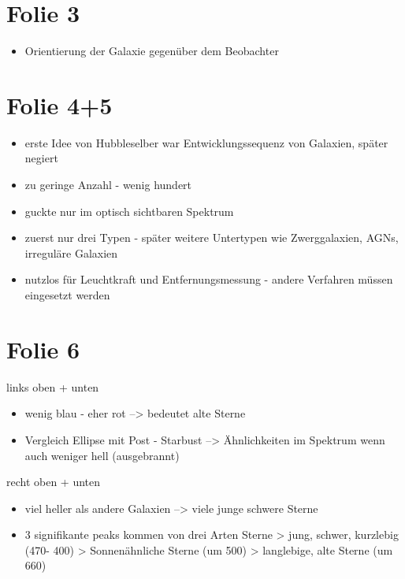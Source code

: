 





\section{Folie 3}


\begin{itemize}
\item Orientierung der Galaxie gegenüber dem Beobachter
\end{itemize}


\section{Folie 4+5}

\begin{itemize}
\item erste Idee von Hubbleselber war Entwicklungssequenz von Galaxien, später negiert
\item zu geringe Anzahl - wenig hundert
\item guckte nur im optisch sichtbaren Spektrum
\item zuerst nur drei Typen - später weitere Untertypen wie Zwerggalaxien, AGNs, irreguläre Galaxien
\item nutzlos für Leuchtkraft und Entfernungsmessung - andere Verfahren müssen eingesetzt werden
\end{itemize}

\newpage


\section{Folie 6}

links oben + unten

\begin{itemize}
\item wenig blau - eher rot --> bedeutet alte Sterne
\item Vergleich  Ellipse mit Post - Starbust --> Ähnlichkeiten im Spektrum wenn auch weniger hell (ausgebrannt)
\end{itemize}


recht oben + unten

\begin{itemize}
\item viel heller als andere Galaxien --> viele junge schwere Sterne
\item 3 signifikante peaks kommen von drei Arten Sterne
\subitem > jung, schwer, kurzlebig (470- 400)
\subitem > Sonnenähnliche Sterne (um 500)
\subitem > langlebige, alte Sterne (um 660)
\end{itemize}


